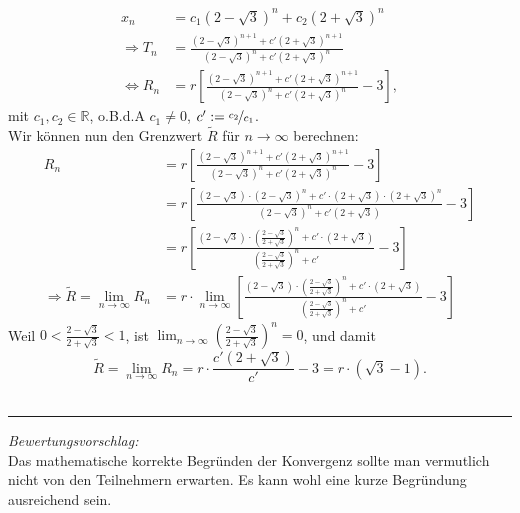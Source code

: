 \documentclass[a4paper]{article}
\numberwithin{equation}{Exercise}
\numberwithin{figure}{Exercise}
\begin{document}
\begin{Answer}[ref = recres]
\begin{align*}
	x_n &= c_1 \left(2-\sqrt{3}\right)^n + c_2 \left(2+\sqrt{3}\right)^n\\
	\Rightarrow T_n &= \frac{\left(2-\sqrt{3}\right)^{n+1} + c'\left(2+\sqrt{3}\right)^{n+1}}{\left(2-\sqrt{3}\right)^{n} + c'\left(2+\sqrt{3}\right)^{n}}\\
	\Leftrightarrow R_n &= r\left[\frac{\left(2-\sqrt{3}\right)^{n+1} + c'\left(2+\sqrt{3}\right)^{n+1}}{\left(2-\sqrt{3}\right)^{n} + c'\left(2+\sqrt{3}\right)^{n}}-3\right],
	\end{align*}
	mit $c_1,c_2\in \mathbb{R}$, o.B.d.A $c_1\neq 0$, $c':= \nicefrac{c_2}{c_1}$.\\
	Wir können nun den Grenzwert $\tilde{R}$ für $n\to\infty$ berechnen:
	\begin{align*}
	R_{n} &= r\left[\frac{\left(2-\sqrt{3}\right)^{n+1} + c'\left(2+\sqrt{3}\right)^{n+1}}{\left(2-\sqrt{3}\right)^{n} + c'\left(2+\sqrt{3}\right)^{n}}-3\right]\\
	&= r\left[\frac{\left(2-\sqrt{3}\right) \cdot \left(2-\sqrt{3}\right)^n + c'\cdot \left(2+\sqrt{3}\right)\cdot \left(2+\sqrt{3}\right)^n}{\left(2-\sqrt{3}\right)^n + c' \left(2+\sqrt{3}\right)}-3\right]\\
	&= r\left[\frac{\left(2-\sqrt{3}\right) \cdot \left(\frac{2-\sqrt{3}}{2+\sqrt{3}}\right)^n + c'\cdot \left(2+\sqrt{3}\right)}{\left(\frac{2-\sqrt{3}}{2+\sqrt{3}}\right)^n + c' }-3\right]\\
	\Rightarrow \tilde{R} =  \lim_{n\to \infty} R_n &= r\cdot \lim_{n\to \infty}\left[\frac{\left(2-\sqrt{3}\right) \cdot \left(\frac{2-\sqrt{3}}{2+\sqrt{3}}\right)^n + c'\cdot \left(2+\sqrt{3}\right)}{\left(\frac{2-\sqrt{3}}{2+\sqrt{3}}\right)^n + c' }-3\right]
	\end{align*}
	Weil $0<\frac{2-\sqrt{3}}{2+\sqrt{3}}<1$, ist $\lim_{n\to \infty}\left(\frac{2-\sqrt{3}}{2+\sqrt{3}}\right)^n = 0$, und damit
	\begin{equation*}
	\boxed{
		\tilde{R} = \lim_{n \to \infty} R_n = r\cdot \frac{c'\left(2+\sqrt{3}\right)}{c'} - 3 = r\cdot \left( \sqrt{3}-1\right).
	}
	\end{equation*}
	\\
	\noindent\rule{\textwidth}{.75pt}
	\textit{Bewertungsvorschlag:}\\
	Das mathematische korrekte Begründen der Konvergenz sollte man vermutlich nicht von den Teilnehmern erwarten. Es kann wohl eine kurze Begründung ausreichend sein.\\
	\begin{table}[h]
		\centering
		\begin{tabular}{|c|c|}

\end{tabular}
\end{table}
\end{Answer}
\end{document}
